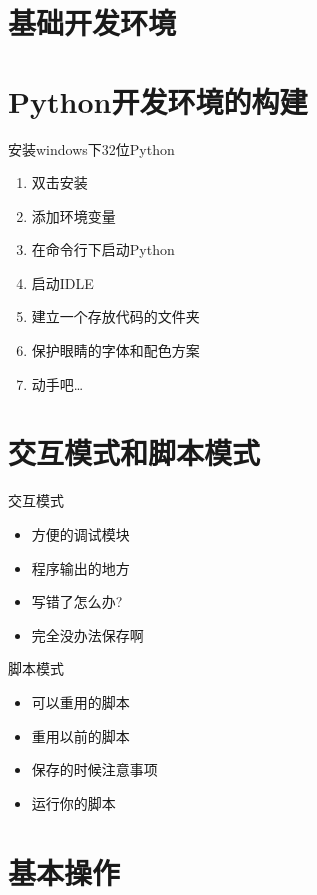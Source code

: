 \documentclass{beamer}
\begin{document}
\section{基础开发环境}
\section{Python开发环境的构建}
\begin{frame}{安装windows下32位Python}
\begin{enumerate}
\item 双击安装
\item 添加环境变量
\item 在命令行下启动Python
\item 启动IDLE
\item 建立一个存放代码的文件夹
\item 保护眼睛的字体和配色方案
\item 动手吧\dots
\end{enumerate}


\end{frame}

\section{交互模式和脚本模式}

\begin{frame}{交互模式}
\begin{itemize}
\item 方便的调试模块
\item 程序输出的地方
\item 写错了怎么办?
\item 完全没办法保存啊

\end{itemize}
\end{frame}

\begin{frame}{脚本模式}
\begin{itemize}
\item 可以重用的脚本
\item 重用以前的脚本
\item 保存的时候注意事项
\item 运行你的脚本

\end{itemize}

\end{frame}

\section{基本操作}
\end{document}
